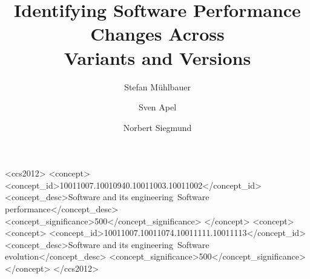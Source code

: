 \documentclass[sigconf, screen]{acmart}
\begin{document}
	
	\title[Identifying Software Performance Changes Across Variants and Versions]{\texorpdfstring{Identifying Software Performance Changes Across\\ Variants and Versions}{Identifying Software Performance Changes Across Variants and Versions}}
	
	
	\author{Stefan Mühlbauer}
	
	\author{Sven Apel}
	
	\author{Norbert Siegmund}
	
	
	\begin{CCSXML}
		<ccs2012>
		<concept>
		<concept_id>10011007.10010940.10011003.10011002</concept_id>
		<concept_desc>Software and its engineering~Software performance</concept_desc>
		<concept_significance>500</concept_significance>
		</concept>
		<concept>
		<concept>
		<concept_id>10011007.10011074.10011111.10011113</concept_id>
		<concept_desc>Software and its engineering~Software evolution</concept_desc>
		<concept_significance>500</concept_significance>
		</concept>
		</ccs2012>
	\end{CCSXML}
	
\end{document}
